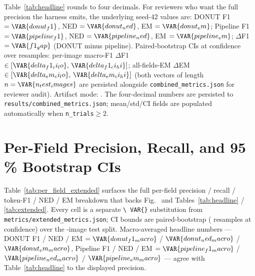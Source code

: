 Table~\ref{tab:headline} rounds to four decimals.  For reviewers who
want the full precision the harness emits, the underlying seed-42
values are:
DONUT F1 $=\VAR{donut_f1}$, NED $=\VAR{donut_ned}$, EM $=\VAR{donut_em}$;
Pipeline F1 $=\VAR{pipeline_f1}$, NED $=\VAR{pipeline_ned}$, EM $=\VAR{pipeline_em}$;
$\Delta$F1 $=\VAR{f1_gap}$ (DONUT minus pipeline).
Paired-bootstrap CIs at  confidence over
 resamples: per-image macro-F1
$\Delta$F1 $\in [\VAR{delta_f1_ci_lo},\,\VAR{delta_f1_ci_hi}]$;
all-fields-EM $\Delta$EM
$\in [\VAR{delta_em_ci_lo},\,\VAR{delta_em_ci_hi}]$
(both vectors of length $n=\VAR{n_test_images}$ are persisted alongside
\texttt{combined\_metrics.json} for reviewer audit).
Artifact mode: \texttt{}.
The four-decimal numbers are persisted to
\texttt{results/combined\_metrics.json}; mean/std/CI fields are
populated automatically when \texttt{n\_trials}$\ge 2$.

\section{Per-Field Precision, Recall, and 95\,\% Bootstrap CIs}
\label{app:per_field_extended}

Table~\ref{tab:per_field_extended} surfaces the full per-field
precision / recall / token-F1 / NED / EM breakdown that backs
Fig.~ and Tables~\ref{tab:headline} /
\ref{tab:extended}.  Every cell is a separate \texttt{\textbackslash
VAR\{\}} substitution from \texttt{metrics/extended\_metrics.json}; CI
bounds are paired-bootstrap ( resamples at
 confidence) over the -image test split.
Macro-averaged headline numbers ---
DONUT F1 / NED / EM $=\VAR{donut_f1_macro}$ / $\VAR{donut_ned_macro}$
/ $\VAR{donut_em_macro}$, Pipeline F1 / NED / EM
$=\VAR{pipeline_f1_macro}$ / $\VAR{pipeline_ned_macro}$ /
$\VAR{pipeline_em_macro}$ --- agree with Table~\ref{tab:headline} to
the displayed precision.

